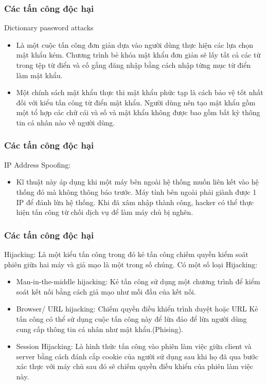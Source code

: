 \documentclass{beamer}
\begin{document}
\begin{frame}
\frametitle{Các tấn công độc hại}
    \begin{block}{Dictionary password attacks}
         \begin{itemize}
    \item Là một cuộc tấn công đơn giản dựa vào người dùng thực hiện các lựa chọn mật khẩu kém. Chương trình bẻ khóa mật khẩu đơn giản sẽ lấy tất cả các từ trong tệp từ điển và cố gắng đăng nhập bằng cách nhập từng mục từ điển làm mật khẩu.
    \item Một chính sách mật khẩu thực thi mật khẩu phức tạp là cách bảo vệ tốt nhất đối với kiểu tấn công từ điển mật khẩu. Người dùng nên tạo mật khẩu gồm một tổ hợp các chữ cái và số và mật khẩu không được bao gồm bất kỳ thông tin cá nhân nào về người dùng.
\end{itemize}
    \end{block}
\end{frame}
\begin{frame}
\frametitle{Các tấn công độc hại}
    \begin{block}{IP Address Spoofing:}
         \begin{itemize}
    \item Kĩ thuật này áp dụng khi một máy bên ngoài hệ thống muốn liên kết vào hệ thống đó mà không thông báo trước. Máy tính bên ngoài phải giành được 1 IP để đánh lừa hệ thống. Khi đã xâm nhập thành công, hacker có thể thực hiện tấn công từ chối dịch vụ để làm máy chủ bị nghẽn. 
\end{itemize}
    \end{block}
\end{frame}
\begin{frame}
\frametitle{Các tấn công độc hại}
\begin{block}{ Hijacking: }
    Là một kiểu tấn công trong đó kẻ tấn công chiếm quyền kiểm soát phiên giữa hai máy và giả mạo là một trong số chúng. Có một số loại Hijacking:
 \begin{itemize}
\item Man-in-the-middle hijacking: Kẻ tấn công sử dụng một chương trình để kiểm soát kết nối bằng cách giả mạo như mỗi đầu của kết nối.
\item Browser/ URL hijacking: Chiếm quyền điều khiển trình duyệt hoặc URL Kẻ tấn công có thể sử dụng cuộc tấn công này để lừa đảo để lừa người dùng cung cấp thông tin cá nhân như mật khẩu.(Phising).
\item Session Hijacking:  Là hình thức tấn công vào phiên làm việc giữa client và server bằng cách đánh cắp cookie của người sử dụng sau khi họ đã qua bước xác thực với máy chủ sau đó sẽ chiếm quyền điều khiển của phiên làm việc này.
\end{itemize}
    \end{block}
\end{frame}
\end{document}
